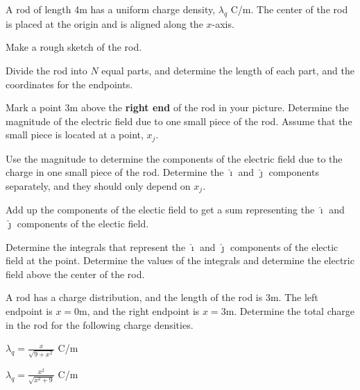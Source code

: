 \begin{problem}
  \item  A rod of length 4m has a uniform charge density, $\lambda_q$ C/m.
  The center of the rod is placed at the origin and is aligned along the
  $x$-axis.
  \begin{subproblem}
    \item Make a rough sketch of the rod.
         \vspace{7em}

   \item Divide the rod into $N$ equal parts, and determine the length of
         each part, and the coordinates for the endpoints.
         \vspace{7em}

   \item Mark a point 3m above the \textbf{right end} of the rod in your picture.
    Determine the magnitude of the electric field due to one small piece of the rod.
    Assume that the small piece is located at a point, $x_j$.

    \vfill

    \clearpage

   \item Use the magnitude to determine the components of the electric field due to the charge in one small piece of the rod.
       Determine the $\hat{\imath}$ and $\hat{\jmath}$ components separately, and they should only depend on $x_j$.
     \vfill

   \item Add up the components of the electic field to get a sum representing the
    $\hat{\imath}$ and $\hat{\jmath}$ components of the electic field.
    \vfill

    \clearpage

    \item Determine the integrals that represent the $\hat{\imath}$ and $\hat{\jmath}$ components of the electic field at the point.
      Determine the values of the integrals and determine the electric field above the center of the rod.
      \vfill
  \end{subproblem}

\clearpage

\item A rod has a charge distribution, and the length of the rod is
  3m. The left endpoint is $x=0$m, and the right endpoint is
  $x=3$m. Determine the total charge in the rod for the following
  charge densities.
  \begin{subproblem}
    \item $\lambda_q = \frac{x}{\sqrt{9+x^2}}$ C/m
      \vfill
    \item $\lambda_q = \frac{x^2}{\sqrt{x^2+9}}$ C/m
      \vfill
  \end{subproblem}
\end{problem}

